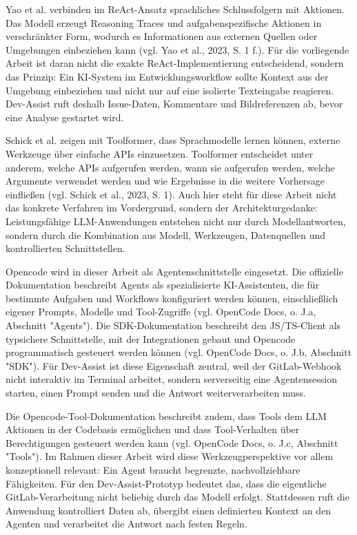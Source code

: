 \documentclass[12pt,a4paper,oneside]{scrreprt}
\begin{document}
Yao et al. verbinden im ReAct-Ansatz sprachliches Schlussfolgern mit Aktionen. Das Modell erzeugt Reasoning Traces und aufgabenspezifische Aktionen in verschränkter Form, wodurch es Informationen aus externen Quellen oder Umgebungen einbeziehen kann (vgl. Yao et al., 2023, S. 1 f.). Für die vorliegende Arbeit ist daran nicht die exakte ReAct-Implementierung entscheidend, sondern das Prinzip: Ein KI-System im Entwicklungsworkflow sollte Kontext aus der Umgebung einbeziehen und nicht nur auf eine isolierte Texteingabe reagieren. Dev-Assist ruft deshalb Issue-Daten, Kommentare und Bildreferenzen ab, bevor eine Analyse gestartet wird.

Schick et al. zeigen mit Toolformer, dass Sprachmodelle lernen können, externe Werkzeuge über einfache APIs einzusetzen. Toolformer entscheidet unter anderem, welche APIs aufgerufen werden, wann sie aufgerufen werden, welche Argumente verwendet werden und wie Ergebnisse in die weitere Vorhersage einfließen (vgl. Schick et al., 2023, S. 1). Auch hier steht für diese Arbeit nicht das konkrete Verfahren im Vordergrund, sondern der Architekturgedanke: Leistungsfähige LLM-Anwendungen entstehen nicht nur durch Modellantworten, sondern durch die Kombination aus Modell, Werkzeugen, Datenquellen und kontrollierten Schnittstellen.

Opencode wird in dieser Arbeit als Agentenschnittstelle eingesetzt. Die offizielle Dokumentation beschreibt Agents als spezialisierte KI-Assistenten, die für bestimmte Aufgaben und Workflows konfiguriert werden können, einschließlich eigener Prompts, Modelle und Tool-Zugriffe (vgl. OpenCode Docs, o. J.a, Abschnitt "Agents"). Die SDK-Dokumentation beschreibt den JS/TS-Client als typsichere Schnittstelle, mit der Integrationen gebaut und Opencode programmatisch gesteuert werden können (vgl. OpenCode Docs, o. J.b, Abschnitt "SDK"). Für Dev-Assist ist diese Eigenschaft zentral, weil der GitLab-Webhook nicht interaktiv im Terminal arbeitet, sondern serverseitig eine Agentensession starten, einen Prompt senden und die Antwort weiterverarbeiten muss.

Die Opencode-Tool-Dokumentation beschreibt zudem, dass Tools dem LLM Aktionen in der Codebasis ermöglichen und dass Tool-Verhalten über Berechtigungen gesteuert werden kann (vgl. OpenCode Docs, o. J.c, Abschnitt "Tools"). Im Rahmen dieser Arbeit wird diese Werkzeugperspektive vor allem konzeptionell relevant: Ein Agent braucht begrenzte, nachvollziehbare Fähigkeiten. Für den Dev-Assist-Prototyp bedeutet das, dass die eigentliche GitLab-Verarbeitung nicht beliebig durch das Modell erfolgt. Stattdessen ruft die Anwendung kontrolliert Daten ab, übergibt einen definierten Kontext an den Agenten und verarbeitet die Antwort nach festen Regeln.
\end{document}
